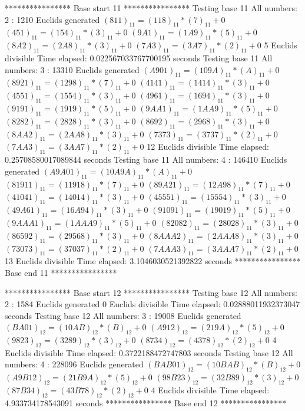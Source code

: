 **************** Base start 11 ****************
Testing base 11 All numbers: 2 :
	 1210 Euclids generated
	$(811)_{11}=(118)_{11}*(7)_{11}+0$
	$(451)_{11}=(154)_{11}*(3)_{11}+0$
	$(9A1)_{11}=(1A9)_{11}*(5)_{11}+0$
	$(8A2)_{11}=(2A8)_{11}*(3)_{11}+0$
	$(7A3)_{11}=(3A7)_{11}*(2)_{11}+0$
	 5 Euclids divisible
Time elapsed: 0.022567033767700195 seconds
Testing base 11 All numbers: 3 :
	 13310 Euclids generated
	$(A901)_{11}=(109A)_{11}*(A)_{11}+0$
	$(8921)_{11}=(1298)_{11}*(7)_{11}+0$
	$(4141)_{11}=(1414)_{11}*(3)_{11}+0$
	$(4551)_{11}=(1554)_{11}*(3)_{11}+0$
	$(4961)_{11}=(1694)_{11}*(3)_{11}+0$
	$(9191)_{11}=(1919)_{11}*(5)_{11}+0$
	$(9AA1)_{11}=(1AA9)_{11}*(5)_{11}+0$
	$(8282)_{11}=(2828)_{11}*(3)_{11}+0$
	$(8692)_{11}=(2968)_{11}*(3)_{11}+0$
	$(8AA2)_{11}=(2AA8)_{11}*(3)_{11}+0$
	$(7373)_{11}=(3737)_{11}*(2)_{11}+0$
	$(7AA3)_{11}=(3AA7)_{11}*(2)_{11}+0$
	 12 Euclids divisible
Time elapsed: 0.25708580017089844 seconds
Testing base 11 All numbers: 4 :
	 146410 Euclids generated
	$(A9A01)_{11}=(10A9A)_{11}*(A)_{11}+0$
	$(81911)_{11}=(11918)_{11}*(7)_{11}+0$
	$(89A21)_{11}=(12A98)_{11}*(7)_{11}+0$
	$(41041)_{11}=(14014)_{11}*(3)_{11}+0$
	$(45551)_{11}=(15554)_{11}*(3)_{11}+0$
	$(49A61)_{11}=(16A94)_{11}*(3)_{11}+0$
	$(91091)_{11}=(19019)_{11}*(5)_{11}+0$
	$(9AAA1)_{11}=(1AAA9)_{11}*(5)_{11}+0$
	$(82082)_{11}=(28028)_{11}*(3)_{11}+0$
	$(86592)_{11}=(29568)_{11}*(3)_{11}+0$
	$(8AAA2)_{11}=(2AAA8)_{11}*(3)_{11}+0$
	$(73073)_{11}=(37037)_{11}*(2)_{11}+0$
	$(7AAA3)_{11}=(3AAA7)_{11}*(2)_{11}+0$
	 13 Euclids divisible
Time elapsed: 3.1046030521392822 seconds
**************** Base end 11 ****************

**************** Base start 12 ****************
Testing base 12 All numbers: 2 :
	 1584 Euclids generated
	 0 Euclids divisible
Time elapsed: 0.02888011932373047 seconds
Testing base 12 All numbers: 3 :
	 19008 Euclids generated
	$(BA01)_{12}=(10AB)_{12}*(B)_{12}+0$
	$(A912)_{12}=(219A)_{12}*(5)_{12}+0$
	$(9823)_{12}=(3289)_{12}*(3)_{12}+0$
	$(8734)_{12}=(4378)_{12}*(2)_{12}+0$
	 4 Euclids divisible
Time elapsed: 0.3722188472747803 seconds
Testing base 12 All numbers: 4 :
	 228096 Euclids generated
	$(BAB01)_{12}=(10BAB)_{12}*(B)_{12}+0$
	$(A9B12)_{12}=(21B9A)_{12}*(5)_{12}+0$
	$(98B23)_{12}=(32B89)_{12}*(3)_{12}+0$
	$(87B34)_{12}=(43B78)_{12}*(2)_{12}+0$
	 4 Euclids divisible
Time elapsed: 4.933734178543091 seconds
**************** Base end 12 ****************

